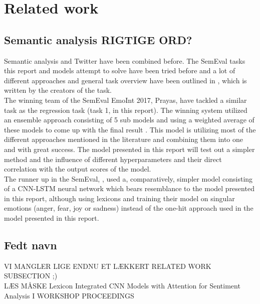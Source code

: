 
\section{Related work}

\subsection{Semantic analysis RIGTIGE ORD?}

Semantic analysis and Twitter have been combined before. The SemEval tasks this report and models attempt to solve have been tried before and a lot of different approaches and general task overview have been outlined in \cite{wassa2017}, which is written by the creators of the task.\\
The winning team of the SemEval EmoInt 2017, Prayas, have tackled a similar task as the regression task (task 1, in this report). The winning system utilized an ensemble approach consisting of 5 sub models and using a weighted average of these models to come up with the final result \cite{prayas}. This model is utilizing most of the different approaches mentioned in the literature and combining them into one and with great success. The model presented in this report will test out a simpler method and the influence of different hyperparameters and their direct correlation with the output scores of the model.\\
The runner up in the SemEval, \cite{ims}, used a, comparatively, simpler model consisting of a CNN-LSTM neural network which bears resemblance to the model presented in this report, although using lexicons and training their model on singular emotions (anger, fear, joy or sadness) instead of the one-hit approach used in the model presented in this report.\\

\subsection{Fedt navn}

VI MANGLER LIGE ENDNU ET LÆKKERT RELATED WORK SUBSECTION ;)\\
LÆS MÅSKE Lexicon Integrated CNN Models with Attention for Sentiment Analysis I WORKSHOP PROCEEDINGS